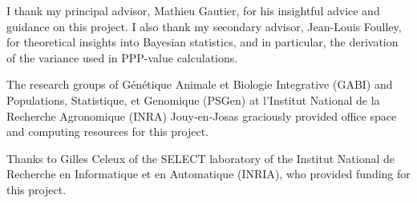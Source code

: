 \documentclass[a4paper,12pt]{article}
\begin{document}
I thank my principal advisor, Mathieu Gautier, for his insightful
advice and guidance on this project. I also thank my secondary
advisor, Jean-Louis Foulley, for theoretical insights into Bayesian
statistics, and in particular, the derivation of the variance used in
PPP-value calculations.

The research groups of G\'en\'etique Animale et Biologie Integrative
(GABI) and Populations, Statistique, et Genomique (PSGen) at
l'Institut National de la Recherche Agronomique (INRA) Jouy-en-Josas
graciously provided office space and computing resources for this
project.

Thanks to Gilles Celeux of the SELECT laboratory of the Institut
National de Recherche en Informatique et en Automatique (INRIA), who
provided funding for this project.



\end{document}
